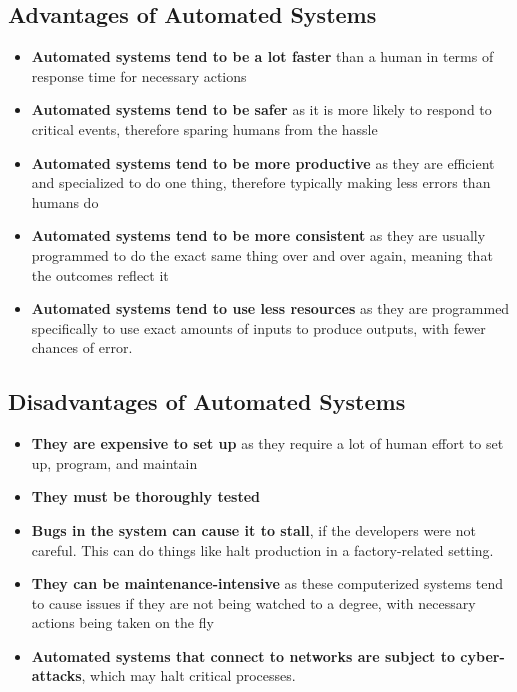 \documentclass[../main.tex]{subfiles}
\begin{document}
\subsection{Advantages of Automated Systems}
\begin{itemize}
    \item \textbf{Automated systems tend to be a lot faster} than a human in terms of response time for necessary actions
    \item \textbf{Automated systems tend to be safer} as it is more likely to respond to critical events, therefore sparing humans from the hassle
    \item \textbf{Automated systems tend to be more productive} as they are efficient and specialized to do one thing, therefore typically making less errors than humans do
    \item \textbf{Automated systems tend to be more consistent} as they are usually programmed to do the exact same thing over and over again, meaning that the outcomes reflect it
    \item \textbf{Automated systems tend to use less resources} as they are programmed specifically to use exact amounts of inputs to produce outputs, with fewer chances of error.
\end{itemize}

\subsection{Disadvantages of Automated Systems}
\begin{itemize}
    \item \textbf{They are expensive to set up} as they require a lot of human effort to set up, program, and maintain
    \item \textbf{They must be thoroughly tested}
    \item \textbf{Bugs in the system can cause it to stall}, if the developers were not careful. This can do things like halt production in a factory-related setting. 
    \item \textbf{They can be maintenance-intensive} as these computerized systems tend to cause issues if they are not being watched to a degree, with necessary actions being taken on the fly
    \item \textbf{Automated systems that connect to networks are subject to cyber-attacks}, which may halt critical processes.
\end{itemize}
\end{document}
